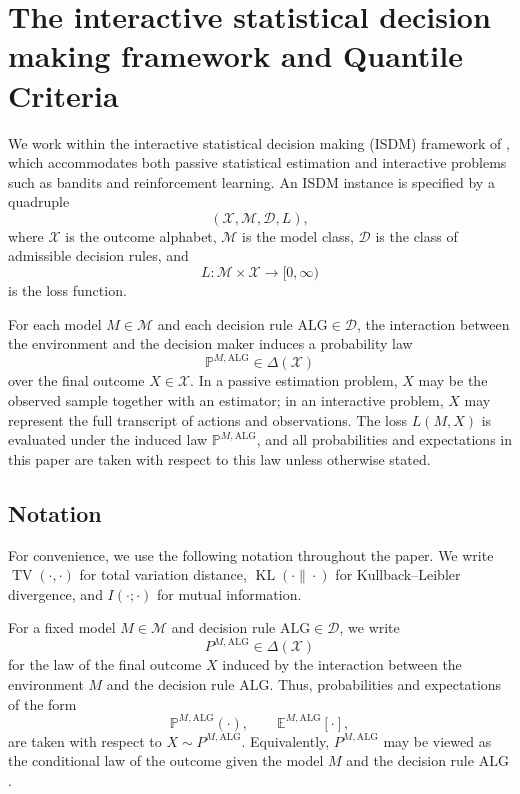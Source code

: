 \documentclass[journal]{IEEEtran}
\newcommand{\ALG}{\mathrm{ALG}}
\newcommand{\TV}{\operatorname{TV}}
\newcommand{\KL}{\operatorname{KL}}
\begin{document}
\section{The interactive statistical decision making framework and Quantile Criteria}
\label{sec:framework}

We work within the interactive statistical decision making (ISDM) framework of \cite{chen2024assouad}, which accommodates both passive statistical estimation and interactive problems such as bandits and reinforcement learning. An ISDM instance is specified by a quadruple
\[
(\mathcal X,\mathcal M,\mathcal D,L),
\]
where \(\mathcal X\) is the outcome alphabet, \(\mathcal M\) is the model class, \(\mathcal D\) is the class of admissible decision rules, and
\[
L:\mathcal M\times \mathcal X \to [0,\infty)
\]
is the loss function.

For each model \(M\in\mathcal M\) and each decision rule \(\ALG\in\mathcal D\), the interaction between the environment and the decision maker induces a probability law
\[
\mathbb P^{M,\ALG}\in \Delta(\mathcal X)
\]
over the final outcome \(X\in\mathcal X\). In a passive estimation problem, \(X\) may be the observed sample together with an estimator; in an interactive problem, \(X\) may represent the full transcript of actions and observations. The loss \(L(M,X)\) is evaluated under the induced law \(\mathbb P^{M,\ALG}\), and all probabilities and expectations in this paper are taken with respect to this law unless otherwise stated.

\subsection{Notation}

For convenience, we use the following notation throughout the paper. We write
\(\TV(\cdot,\cdot)\) for total variation distance, \(\KL(\cdot\|\cdot)\) for
Kullback--Leibler divergence, and \(I(\cdot;\cdot)\) for mutual information.

For a fixed model \(M\in\mathcal M\) and decision rule
\(\ALG\in\mathcal D\), we write
\[
P^{M,\ALG}\in\Delta(\mathcal X)
\]
for the law of the final outcome \(X\) induced by the interaction between the
environment \(M\) and the decision rule \(\ALG\). Thus, probabilities and
expectations of the form
\[
\mathbb P^{M,\ALG}(\cdot),
\qquad
\mathbb E^{M,\ALG}[\cdot],
\]
are taken with respect to \(X\sim P^{M,\ALG}\). Equivalently,
\(P^{M,\ALG}\) may be viewed as the conditional law of the outcome given the
model \(M\) and the decision rule \(\ALG\).
\end{document}
